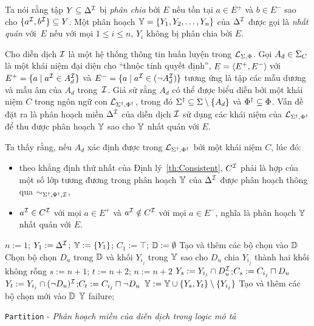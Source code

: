 Ta nói rằng tập $Y \subseteq \Delta^{\mathcal{I}}$ bị {\em phân chia} bởi $E$ nếu tồn tại $a \in E^+$ và $b \in E^-$ sao cho $\{a^{\mathcal{I}}, b^{\mathcal{I}}\} \subseteq Y$. Một phân hoạch $\mathbb{Y} = \{Y_1, Y_2, \ldots, Y_n\}$ của $\Delta^{\mathcal{I}}$ được gọi là {\em nhất quán} với~$E$ nếu với mọi $1 \leq i \leq n$, $Y_i$ không bị phân chia bởi $E$.

Cho diễn dịch $\mathcal{I}$ là một hệ thống thông tin huấn luyện trong $\mathcal{L}_{\Sigma,\Phi}$. Gọi $A_d \in \Sigma_C$ là một khái niệm đại diện cho ``thuộc tính quyết định'', $E = \left\langle E^+, E^-\right\rangle\!$ với $E^+ = \{a \mid a^{\mathcal{I}} \in A_d^{\mathcal{I}}\}$ và $E^- = \{a \mid a^{\mathcal{I}} \in (\neg A_d^{\mathcal{I}})\}$ tương ứng là tập các mẫu dương và mẫu âm của $A_d$ trong~$\mathcal{I}$. Giả sử rằng $A_d$ có thể được biểu diễn bởi một khái niệm $C$ trong ngôn ngữ con $\mathcal{L}_{\Sigma^\dag,\Phi^\dag}$, trong đó $\Sigma^\dag \subseteq \Sigma \setminus \{A_d\}$ và $\Phi^\dag \subseteq \Phi$. Vấn đề đặt ra là phân hoạch miền $\Delta^{\mathcal{I}}$ của diễn dịch $\mathcal{I}$ sử dụng các khái niệm của $\mathcal{L}_{\Sigma^\dag,\Phi^\dag}$ để thu được phân hoạch $\mathbb{Y}$ sao cho $\mathbb{Y}$ nhất quán với $E$.

Ta thấy rằng, nếu $A_d$ xác định được trong $\mathcal{L}_{\Sigma^\dag,\Phi^\dag}$ bởi một khái niệm $C$, lúc đó:
\begin{itemize}
	\item theo khẳng định thứ nhất của Định lý~\ref{th:Consistent}, $C^{\mathcal{I}}$ phải là hợp của một số lớp tương đương trong phân hoạch $\mathbb{Y}$ của $\Delta^{\mathcal{I}}$ được phân hoạch thông qua $\sim_{\Sigma^\dag,\Phi^\dag,\mathcal{I}}$,
	
	\item $a^{\mathcal{I}} \in C^{\mathcal{I}}$ với mọi $a \in E^+$ và $a^{\mathcal{I}} \notin C^{\mathcal{I}}$ với mọi $a \in E^-$, nghĩa là phân hoạch $\mathbb{Y}$ nhất quán với $E$.
\end{itemize}

\begin{algorithm}[t]	
	
	\BlankLine
	$n:=1$; $Y_1 := \Delta^{\mathcal{I}}$; $\mathbb{Y} := \{Y_1\}$; $C_1 := \top$; $\mathbb{D} := \emptyset$\;
	Tạo và thêm các bộ chọn vào $\mathbb{D}$\label{step:CreateSelector1}
	{
		Chọn bộ chọn $D_u$ trong $\mathbb{D}$ và khối $Y_{i_j}$ trong $\mathbb{Y}$ sao cho $D_u$ chia $Y_{i_j}$ thành hai khối không rỗng\label{step:ChooseBlock}\;
		$s:=n+1$; $t:=n+2$; $n:=n+2$\;
		$Y_s := Y_{i_j} \cap D_u^{\mathcal{I}}$;\qquad\quad\!$C_s := C_{i_j} \sqcap D_u$\;
		$Y_t := Y_{i_j} \cap (\neg D_u)^{\mathcal{I}}$;\quad $C_t := C_{i_j} \sqcap \neg D_u$\;
		$\mathbb{Y} := \mathbb{Y} \cup \{Y_s, Y_t\} \setminus \{Y_{i_j}\}$\;    
		Tạo và thêm các bộ chọn mới vào $\mathbb{D}$\label{step:CreateSelector2}
	}
	{
		\Return $\mathbb{Y}$\;
	}
	{
		\Return failure;
	}
	\caption{\texttt{Partition} - {\em Phân hoạch miền của diễn dịch trong logic mô tả}} \label{alg:Partition}
\end{algorithm}

